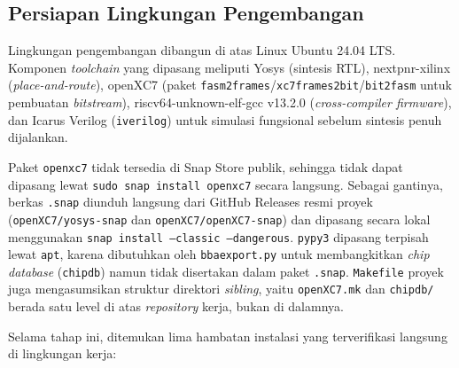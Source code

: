 
\subsection{Persiapan Lingkungan Pengembangan}

Lingkungan pengembangan dibangun di atas Linux Ubuntu 24.04 LTS. Komponen \textit{toolchain} yang dipasang meliputi Yosys (sintesis RTL), nextpnr-xilinx (\textit{place-and-route}), openXC7 (paket \texttt{fasm2frames}/\texttt{xc7frames2bit}/\texttt{bit2fasm} untuk pembuatan \textit{bitstream}), riscv64-unknown-elf-gcc v13.2.0 (\textit{cross-compiler firmware}), dan Icarus Verilog (\texttt{iverilog}) untuk simulasi fungsional sebelum sintesis penuh dijalankan.

Paket \texttt{openxc7} tidak tersedia di Snap Store publik, sehingga tidak dapat dipasang lewat \texttt{sudo snap install openxc7} secara langsung. Sebagai gantinya, berkas \texttt{.snap} diunduh langsung dari GitHub Releases resmi proyek (\texttt{openXC7/yosys-snap} dan \texttt{openXC7/openXC7-snap}) dan dipasang secara lokal menggunakan \texttt{snap install --classic --dangerous}. \texttt{pypy3} dipasang terpisah lewat \texttt{apt}, karena dibutuhkan oleh \texttt{bbaexport.py} untuk membangkitkan \textit{chip database} (\texttt{chipdb}) namun tidak disertakan dalam paket \texttt{.snap}. \texttt{Makefile} proyek juga mengasumsikan struktur direktori \textit{sibling}, yaitu \texttt{openXC7.mk} dan \texttt{chipdb/} berada satu level di atas \textit{repository} kerja, bukan di dalamnya.

Selama tahap ini, ditemukan lima hambatan instalasi yang terverifikasi langsung di lingkungan kerja:

